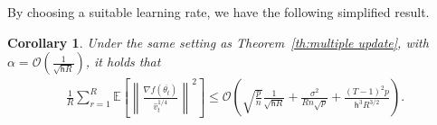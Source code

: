 \documentclass[11pt]{article}
\newtheorem{Theorem}{Theorem}
\newtheorem{Corollary}{Corollary}
\newcommand{\beq}{\begin{equation}}
\newcommand{\eeq}{\end{equation}}
\newcommand{\eqdef}{\mathrel{\mathop:}=}
\def\EE{\mathbb{E}}
\def\tot{\mathsf{h}}
\begin{document}
By choosing a suitable learning rate, we have the following simplified result.
\begin{Corollary}\label{coro:main}
Under the same setting as Theorem~\ref{th:multiple update}, with $\alpha = \mathcal{O}(\frac{1}{ \sqrt{\tot R}})$, it holds that
\begin{align} \label{coro:rate}
    \frac{1}{R}\sum_{r=1}^R  \EE\left[ \left\| \frac{\nabla f(\overline{\theta_t})}{\hat v_t^{1/4}}   \right \|^2 \right] \leq \mathcal{O}\left( \sqrt{\frac{ p}{n}} \frac{1}{\sqrt{\tot R}} + \frac{\sigma^2 }{R n\sqrt{p}}+\frac{(T-1)^2p}{\tot^3 R^{3/2}}\right).
\end{align}
\end{Corollary}



\end{document}
